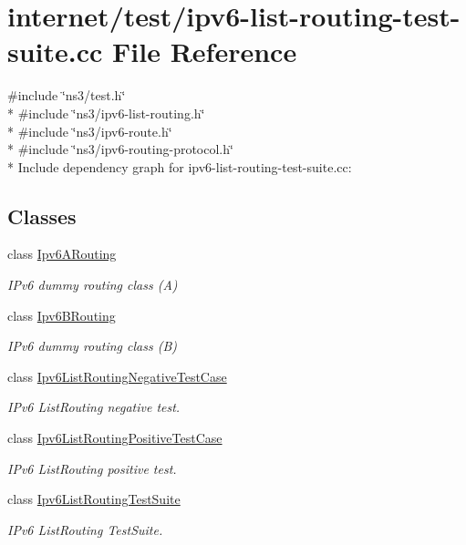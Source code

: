 \hypertarget{ipv6-list-routing-test-suite_8cc}{}\section{internet/test/ipv6-\/list-\/routing-\/test-\/suite.cc File Reference}
\label{ipv6-list-routing-test-suite_8cc}
{\ttfamily \#include \char`\"{}ns3/test.\+h\char`\"{}}\\*
{\ttfamily \#include \char`\"{}ns3/ipv6-\/list-\/routing.\+h\char`\"{}}\\*
{\ttfamily \#include \char`\"{}ns3/ipv6-\/route.\+h\char`\"{}}\\*
{\ttfamily \#include \char`\"{}ns3/ipv6-\/routing-\/protocol.\+h\char`\"{}}\\*
Include dependency graph for ipv6-\/list-\/routing-\/test-\/suite.cc\+:
\subsection*{Classes}
\begin{DoxyCompactItemize}
\item 
class \hyperlink{classIpv6ARouting}{Ipv6\+A\+Routing}
\begin{DoxyCompactList}\small\item\em I\+Pv6 dummy routing class (A) \end{DoxyCompactList}\item 
class \hyperlink{classIpv6BRouting}{Ipv6\+B\+Routing}
\begin{DoxyCompactList}\small\item\em I\+Pv6 dummy routing class (B) \end{DoxyCompactList}\item 
class \hyperlink{classIpv6ListRoutingNegativeTestCase}{Ipv6\+List\+Routing\+Negative\+Test\+Case}
\begin{DoxyCompactList}\small\item\em I\+Pv6 List\+Routing negative test. \end{DoxyCompactList}\item 
class \hyperlink{classIpv6ListRoutingPositiveTestCase}{Ipv6\+List\+Routing\+Positive\+Test\+Case}
\begin{DoxyCompactList}\small\item\em I\+Pv6 List\+Routing positive test. \end{DoxyCompactList}\item 
class \hyperlink{classIpv6ListRoutingTestSuite}{Ipv6\+List\+Routing\+Test\+Suite}
\begin{DoxyCompactList}\small\item\em I\+Pv6 List\+Routing Test\+Suite. \end{DoxyCompactList}\end{DoxyCompactItemize}
